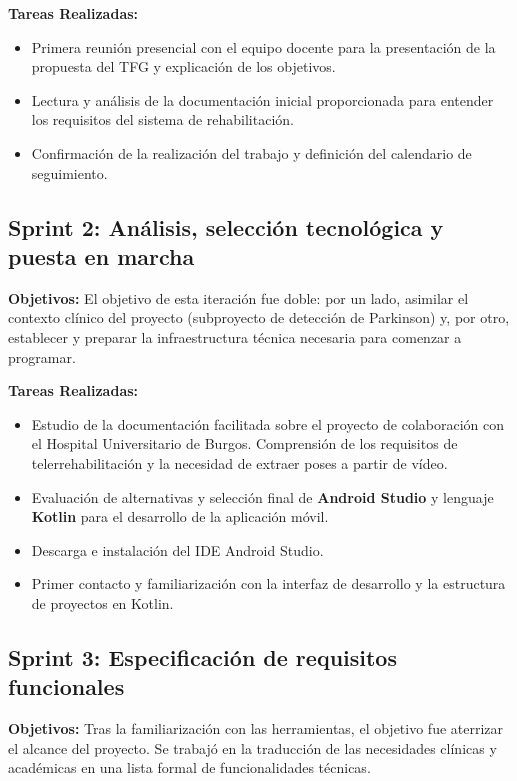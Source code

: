 \textbf{Tareas Realizadas:}
\begin{itemize}
    \item Primera reunión presencial con el equipo docente para la presentación de la propuesta del TFG y explicación de los objetivos.
    \item Lectura y análisis de la documentación inicial proporcionada para entender los requisitos del sistema de rehabilitación.
    \item Confirmación de la realización del trabajo y definición del calendario de seguimiento.
\end{itemize}

\subsection{Sprint 2: Análisis, selección tecnológica y puesta en marcha}
\textbf{Objetivos:} El objetivo de esta iteración fue doble: por un lado, asimilar el contexto clínico del proyecto (subproyecto de detección de Parkinson) y, por otro, establecer y preparar la infraestructura técnica necesaria para comenzar a programar.

\textbf{Tareas Realizadas:}
\begin{itemize}
    \item Estudio de la documentación facilitada sobre el proyecto de colaboración con el Hospital Universitario de Burgos. Comprensión de los requisitos de telerrehabilitación y la necesidad de extraer poses a partir de vídeo.
    \item Evaluación de alternativas y selección final de \textbf{Android Studio} y lenguaje \textbf{Kotlin} para el desarrollo de la aplicación móvil.
    \item Descarga e instalación del IDE Android Studio.
    \item Primer contacto y familiarización con la interfaz de desarrollo y la estructura de proyectos en Kotlin.
\end{itemize}

\subsection{Sprint 3: Especificación de requisitos funcionales}
\textbf{Objetivos:} Tras la familiarización con las herramientas, el objetivo fue aterrizar el alcance del proyecto. Se trabajó en la traducción de las necesidades clínicas y académicas en una lista formal de funcionalidades técnicas.

